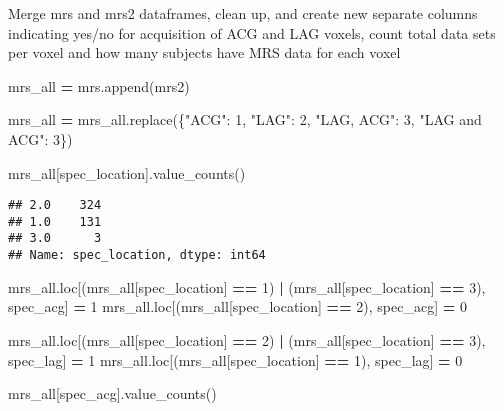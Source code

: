 \documentclass[
]{article}
\newenvironment{Shaded}{\begin{snugshade}}{\end{snugshade}}
\newcommand{\DecValTok}[1]{\textcolor[rgb]{0.00,0.00,0.81}{#1}}
\newcommand{\NormalTok}[1]{#1}
\newcommand{\OperatorTok}[1]{\textcolor[rgb]{0.81,0.36,0.00}{\textbf{#1}}}
\newcommand{\StringTok}[1]{\textcolor[rgb]{0.31,0.60,0.02}{#1}}
\begin{document}
Merge mrs and mrs2 dataframes, clean up, and create new separate columns
indicating yes/no for acquisition of ACG and LAG voxels, count total
data sets per voxel and how many subjects have MRS data for each voxel

\begin{Shaded}
\begin{Highlighting}[]
\NormalTok{mrs\_all }\OperatorTok{=}\NormalTok{ mrs.append(mrs2)}

\NormalTok{mrs\_all }\OperatorTok{=}\NormalTok{ mrs\_all.replace(\{}\StringTok{"ACG"}\NormalTok{: }\DecValTok{1}\NormalTok{, }\StringTok{"LAG"}\NormalTok{: }\DecValTok{2}\NormalTok{, }\StringTok{"LAG, ACG"}\NormalTok{: }\DecValTok{3}\NormalTok{, }\StringTok{"LAG and ACG"}\NormalTok{: }\DecValTok{3}\NormalTok{\})}

\NormalTok{mrs\_all[}\StringTok{\textquotesingle{}spec\_location\textquotesingle{}}\NormalTok{].value\_counts()}
\end{Highlighting}
\end{Shaded}

\begin{verbatim}
## 2.0    324
## 1.0    131
## 3.0      3
## Name: spec_location, dtype: int64
\end{verbatim}

\begin{Shaded}
\begin{Highlighting}[]
\NormalTok{mrs\_all.loc[(mrs\_all[}\StringTok{\textquotesingle{}spec\_location\textquotesingle{}}\NormalTok{] }\OperatorTok{==} \DecValTok{1}\NormalTok{) }\OperatorTok{|}\NormalTok{ (mrs\_all[}\StringTok{\textquotesingle{}spec\_location\textquotesingle{}}\NormalTok{] }\OperatorTok{==} \DecValTok{3}\NormalTok{), }\StringTok{\textquotesingle{}spec\_acg\textquotesingle{}}\NormalTok{] }\OperatorTok{=} \DecValTok{1}
\NormalTok{mrs\_all.loc[(mrs\_all[}\StringTok{\textquotesingle{}spec\_location\textquotesingle{}}\NormalTok{] }\OperatorTok{==} \DecValTok{2}\NormalTok{), }\StringTok{\textquotesingle{}spec\_acg\textquotesingle{}}\NormalTok{] }\OperatorTok{=} \DecValTok{0}

\NormalTok{mrs\_all.loc[(mrs\_all[}\StringTok{\textquotesingle{}spec\_location\textquotesingle{}}\NormalTok{] }\OperatorTok{==} \DecValTok{2}\NormalTok{) }\OperatorTok{|}\NormalTok{ (mrs\_all[}\StringTok{\textquotesingle{}spec\_location\textquotesingle{}}\NormalTok{] }\OperatorTok{==} \DecValTok{3}\NormalTok{), }\StringTok{\textquotesingle{}spec\_lag\textquotesingle{}}\NormalTok{] }\OperatorTok{=} \DecValTok{1}
\NormalTok{mrs\_all.loc[(mrs\_all[}\StringTok{\textquotesingle{}spec\_location\textquotesingle{}}\NormalTok{] }\OperatorTok{==} \DecValTok{1}\NormalTok{), }\StringTok{\textquotesingle{}spec\_lag\textquotesingle{}}\NormalTok{] }\OperatorTok{=} \DecValTok{0}

\NormalTok{mrs\_all[}\StringTok{\textquotesingle{}spec\_acg\textquotesingle{}}\NormalTok{].value\_counts()}
\end{Highlighting}
\end{Shaded}
\end{document}
